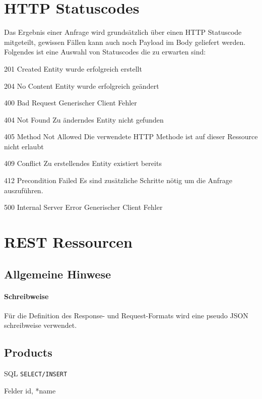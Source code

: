 \documentclass[10pt,a4paper]{scrartcl}
\begin{document}
\pagebreak
\section{HTTP Statuscodes}
Das Ergebnis einer Anfrage wird grundsätzlich über einen HTTP Statuscode mitgeteilt, gewissen Fällen
kann auch noch Payload im Body geliefert werden. Folgendes ist eine Auswahl von Statuscodes die zu
erwarten sind:
\begin{description*}
	\item[201 Created] Entity wurde erfolgreich erstellt
	\item[204 No Content] Entity wurde erfolgreich geändert
	\item[400 Bad Request] Generischer Client Fehler
	\item[404 Not Found] Zu änderndes Entity nicht gefunden
	\item[405 Method Not Allowed] Die verwendete HTTP Methode ist auf dieser Ressource nicht erlaubt
	\item[409 Conflict] Zu erstellendes Entity existiert bereits
	\item[412 Precondition Failed] Es sind zusätzliche Schritte nötig um die Anfrage auszuführen.
	\item[500 Internal Server Error] Generischer Client Fehler
\end{description*}

\pagebreak
\section{REST Ressourcen}
\subsection{Allgemeine Hinwese}
\paragraph{Schreibweise}
Für die Definition des Response- und Request-Formats wird eine pseudo JSON schreibweise verwendet.

\subsection{Products}

\begin{description*}
	\item[SQL] \texttt{SELECT/INSERT}
	\item[Felder] id, *name
\end{description*}
\end{document}
